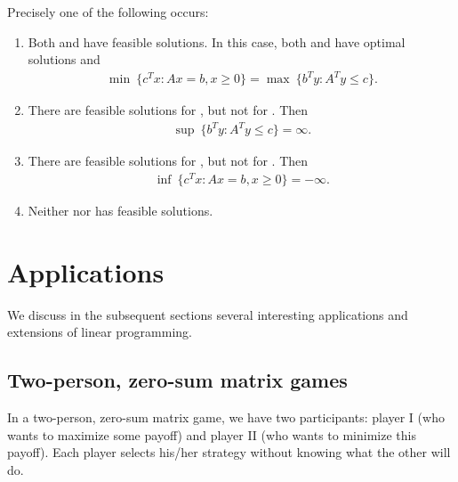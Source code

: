 \begin{theorem}
Precisely one of the following occurs:
\begin{enumerate}
    \item Both  and  have feasible solutions.
    In this case, both  and  have optimal solutions and
    \begin{align}
    \min \ \{ c^T x : Ax = b, x \ge 0 \} = \max \ \{ b^T y : A^T y \le c \}.
    \end{align}
    \item There are feasible solutions for , but not for . 
    Then
    \begin{align}
    \sup \ \{ b^T y : A^T y \le c \} = \infty.    
    \end{align}
    \item There are feasible solutions for , but not for . 
    Then 
    \begin{align}
    \inf \ \{ c^T x : Ax = b, x \ge 0 \} = -\infty.
    \end{align}
    \item Neither  nor  has feasible solutions.
\end{enumerate}
\end{theorem}


\section{Applications}

We discuss in the subsequent sections several interesting applications and extensions of linear programming.

\subsection{Two-person, zero-sum matrix games}

In a two-person, zero-sum matrix game, we have two participants: player I (who wants to maximize some payoff) and player II (who wants to minimize this payoff). 
Each player selects his/her strategy without knowing what the
other will do.

